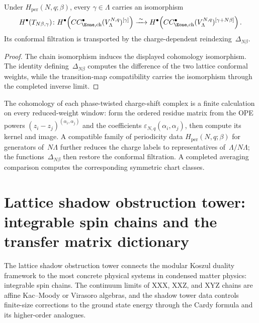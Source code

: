 \begin{corollary}
\label{cor:lattice:e1-hochschild-periodicity}
Under $H_{\mathrm{per}}(N,q;\beta)$, every $\gamma\in\Lambda$ carries
an isomorphism
\[
 H^\bullet(T_{N\beta,\gamma})\colon
 H^\bullet\!\left(
 CC^\bullet_{\Eone,\mathrm{ch}}(V_\Lambda^{N,q})^{[\gamma]}
 \right)
 \xrightarrow{\;\sim\;}
 H^\bullet\!\left(
 CC^\bullet_{\Eone,\mathrm{ch}}(V_\Lambda^{N,q})^{[\gamma+N\beta]}
 \right).
\]
Its conformal filtration is transported by the charge-dependent
reindexing~$\Delta_{N\beta}$.
\end{corollary}

\begin{proof}
The chain isomorphism induces the displayed cohomology isomorphism.
The identity defining~$\Delta_{N\beta}$ computes the difference of the
two lattice conformal weights, while the transition-map compatibility
carries the isomorphism through the completed inverse limit.
\end{proof}

\begin{remark}
\label{rem:lattice:e1-hochschild-nonzero-computation}
The cohomology of each phase-twisted charge-shift complex is a finite
calculation on every reduced-weight window: form the ordered residue
matrix from the OPE powers $(z_i-z_j)^{(\alpha_i,\alpha_j)}$ and the
coefficients $\varepsilon_{N,q}(\alpha_i,\alpha_j)$, then compute its
kernel and image.  A compatible family of periodicity data
$H_{\mathrm{per}}(N,q;\beta)$ for generators of~$N\Lambda$ further
reduces the charge labels to representatives of~$\Lambda/N\Lambda$;
the functions~$\Delta_{N\beta}$ then restore the conformal filtration.
A completed averaging comparison computes the corresponding symmetric
chart classes.
\end{remark}


\section{Lattice shadow obstruction tower: integrable spin chains and the
transfer matrix dictionary}%
\label{sec:lattice-shadow-spin-chains}

The lattice shadow obstruction tower connects the modular Koszul duality framework
to the most concrete physical systems in condensed matter physics:
integrable spin chains. The continuum limits of XXX, XXZ, and XYZ
chains are affine Kac--Moody or Virasoro algebras, and the shadow
tower data controls finite-size corrections to the ground state energy
through the Cardy formula and its higher-order analogues.

